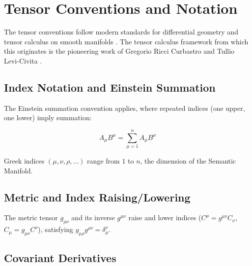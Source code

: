 
\section{Tensor Conventions and Notation}
\label{2.4:tensor_conventions_and_notation}

The tensor conventions follow modern standards for differential geometry and tensor calculus on smooth manifolds \autocite{Lee2003, MisnerThorneWheeler1973}. The tensor calculus framework from which this originates is the pioneering work of Gregorio Ricci Curbastro and Tullio Levi-Civita \autocite{RicciLeviCivita1901}.


\subsection{Index Notation and Einstein Summation}
\label{2.4.1:index_notation_and_einstein_summation}

The Einstein summation convention \autocite{Einstein1916} applies, where repeated indices (one upper, one lower) imply summation:

\begin{equation}
A_\mu B^\mu = \sum_{\mu=1}^n A_\mu B^\mu
\end{equation}

Greek indices \((\mu,\nu,\rho,...)\) range from \(1\) to \(n\), the dimension of the Semantic Manifold.


\subsection{Metric and Index Raising/Lowering}
\label{2.4.2:metric_and_index_raising_lowering}

The metric tensor \(g_{\mu\nu}\) and its inverse \(g^{\mu\nu}\) raise and lower indices (\(C^\mu = g^{\mu\nu} C_\nu\), \(C_\mu = g_{\mu\nu} C^\nu\)), satisfying \(g_{\mu\rho} g^{\rho\nu} = \delta_\mu^\nu\).


\subsection{Covariant Derivatives}
\label{2.4.3:covariant_derivatives}


